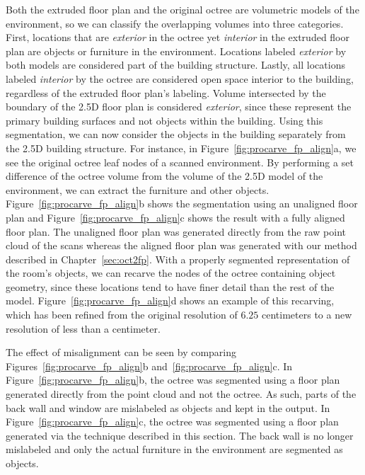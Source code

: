 \documentclass[12pt,onecolumn,oneside]{book}
\begin{document}
Both the extruded floor plan and the original octree are volumetric models of the environment, so we can classify the overlapping volumes into three categories.  First, locations that are {\it exterior} in the octree yet {\it interior} in the extruded floor plan are objects or furniture in the environment.  Locations labeled {\it exterior} by both models are considered part of the building structure.  Lastly, all locations labeled {\it interior} by the octree are considered open space interior to the building, regardless of the extruded floor plan's labeling.  Volume intersected by the boundary of the 2.5D floor plan is considered {\it exterior}, since these represent the primary building surfaces and not objects within the building.  Using this segmentation, we can now consider the objects in the building separately from the 2.5D building structure.  For instance, in Figure~\ref{fig:procarve_fp_align}a, we see the original octree leaf nodes of a scanned environment.  By performing a set difference of the octree volume from the volume of the 2.5D model of the environment, we can extract the furniture and other objects.  Figure~\ref{fig:procarve_fp_align}b shows the segmentation using an unaligned floor plan and Figure~\ref{fig:procarve_fp_align}c shows the result with a fully aligned floor plan.  The unaligned floor plan was generated directly from the raw point cloud of the scans whereas the aligned floor plan was generated with our method described in Chapter~\ref{sec:oct2fp}.  With a properly segmented representation of the room's objects, we can recarve the nodes of the octree containing object geometry, since these locations tend to have finer detail than the rest of the model.  Figure~\ref{fig:procarve_fp_align}d shows an example of this recarving, which has been refined from the original resolution of $6.25$ centimeters to a new resolution of less than a centimeter.


The effect of misalignment can be seen by comparing Figures~\ref{fig:procarve_fp_align}b and~\ref{fig:procarve_fp_align}c.  In Figure~\ref{fig:procarve_fp_align}b, the octree was segmented using a floor plan generated directly from the point cloud and not the octree.  As such, parts of the back wall and window are mislabeled as objects and kept in the output.  In Figure~\ref{fig:procarve_fp_align}c, the octree was segmented using a floor plan generated via the technique described in this section.  The back wall is no longer mislabeled and only the actual furniture in the environment are segmented as objects.
\end{document}
